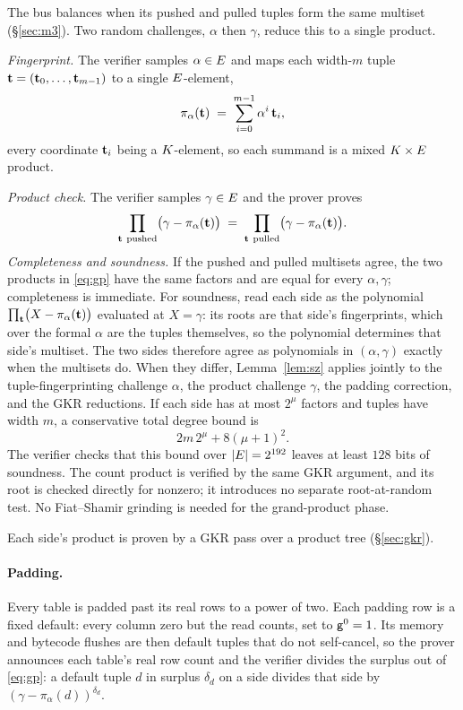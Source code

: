 The bus balances when its pushed and pulled tuples form the same multiset (\S\ref{sec:m3}). Two random challenges, $\alpha$ then $\gamma$, reduce this to a single product.

\emph{Fingerprint.} The verifier samples $\alpha\in E$ and maps each width-$m$ tuple $\mathbf{t}=(\mathbf{t}_0,\dots,\mathbf{t}_{m-1})$ to a single $E$-element,
\[
\pi_\alpha(\mathbf{t})\;=\;\sum_{i=0}^{m-1}\alpha^{i}\,\mathbf{t}_i ,
\]
every coordinate $\mathbf{t}_i$ being a $K$-element, so each summand is a mixed $K\times E$ product.

\emph{Product check.} The verifier samples $\gamma\in E$ and the prover proves
\begin{equation}
\prod_{\btup\ \text{pushed}}\bigl(\gamma-\pi_\alpha(\btup)\bigr)
\;=\;
\prod_{\btup\ \text{pulled}}\bigl(\gamma-\pi_\alpha(\btup)\bigr).
\label{eq:gp}
\end{equation}
\emph{Completeness and soundness.} If the pushed and pulled multisets agree, the two products in \eqref{eq:gp} have the same factors and are equal for every $\alpha,\gamma$; completeness is immediate. For soundness, read each side as the polynomial $\prod_{\mathbf{t}}\bigl(X-\pi_\alpha(\mathbf{t})\bigr)$ evaluated at $X=\gamma$: its roots are that side's fingerprints, which over the formal $\alpha$ are the tuples themselves, so the polynomial determines that side's multiset. The two sides therefore agree as polynomials in $(\alpha,\gamma)$ exactly when the multisets do. When they differ, Lemma~\ref{lem:sz} applies jointly to the tuple-fingerprinting challenge $\alpha$, the product challenge $\gamma$, the padding correction, and the GKR reductions. If each side has at most $2^\mu$ factors and tuples have width $m$, a conservative total degree bound is
\[
  2m\,2^\mu+8(\mu+1)^2.
\]
The verifier checks that this bound over $|E|=2^{192}$ leaves at least $128$ bits of soundness. The count product is verified by the same GKR argument, and its root is checked directly for nonzero; it introduces no separate root-at-random test. No Fiat--Shamir grinding is needed for the grand-product phase.

Each side's product is proven by a GKR pass over a product tree (\S\ref{sec:gkr}).

\paragraph{Padding.} Every table is padded past its real rows to a power of two. Each padding row is a fixed default: every column zero but the read counts, set to $\mathsf{g}^{0}=1$. Its memory and bytecode flushes are then default tuples that do not self-cancel, so the prover announces each table's real row count and the verifier divides the surplus out of \eqref{eq:gp}: a default tuple $d$ in surplus $\delta_d$ on a side divides that side by $(\gamma-\pi_\alpha(d))^{\delta_d}$.

